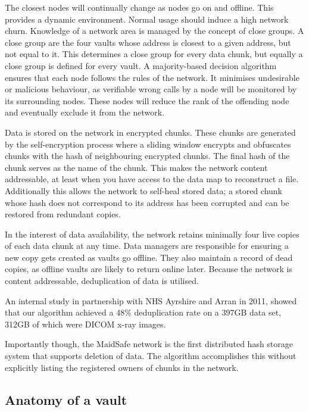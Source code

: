 \documentclass[twocolumn,english]{article}
\begin{document}
The closest nodes will continually change as nodes go on and offline. This provides a dynamic environment.  Normal usage should  induce a high network churn. Knowledge of a network area is managed by the concept of close groups.  A close group are the four vaults whose address is closest to a given address, but not equal to it.  This determines a close group for every data chunk, but equally a close group is defined for every vault. A majority-based decision algorithm ensures that each node follows the rules of the network. It minimises undesirable or malicious behaviour, as verifiable wrong calls by a node will be monitored by its surrounding nodes.  These nodes will reduce the rank of the offending node and eventually exclude it from the network.\cite{msVault} 

Data is stored on the network in encrypted chunks. These chunks are generated by the self-encryption process where a sliding window encrypts and obfuscates chunks with the hash of neighbouring encrypted chunks. The final hash of the chunk serves as the name of the chunk.  This makes the network content addressable, at least when you have access to the data map to reconstruct a file\cite{msEncrypt}. Additionally this allows the network to self-heal stored data; a stored chunk whose hash does not correspond to its address has been corrupted and can be restored from redundant copies.

In the interest of data availability, the network retains minimally four live
copies of each data chunk at any time. Data managers are responsible for ensuring a new copy gets created as vaults go offline.  They also maintain a record of dead copies, as offline vaults are likely to return online later.  Because the network is content addressable, deduplication of data is utilised.

An internal study in partnership with NHS Ayrshire and Arran in 2011, showed that our algorithm achieved a 48\% deduplication rate on a 397GB data set, 312GB of which were DICOM x-ray images.

Importantly though, the MaidSafe network is the first distributed hash storage system that supports deletion of data.  The algorithm accomplishes this without explicitly listing the registered owners of chunks in the network. 


\subsection{Anatomy of a vault}\label{anatomy}
\end{document}
